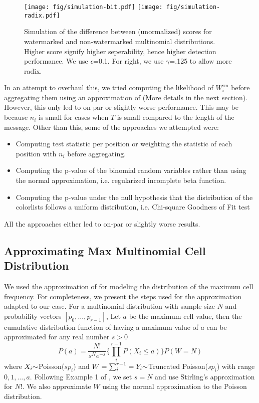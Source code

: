 \begin{figure}[th!]
    \centering
    \texttt{[image: fig/simulation-bit.pdf]}
    \texttt{[image: fig/simulation-radix.pdf]}
    \caption{Simulation of the difference between (unormalized) scores for watermarked and non-watermarked multinomial distributions. Higher score signify higher seperability, hence higher detection performance. We use $\epsilon$=0.1. For right, we use $\gamma$=.125 to allow more radix.}\label{fig:simulation}
\end{figure}

In an attempt to overhaul this, we tried computing the likelihood of $W_i^\text{rm}$ before aggregating them using an approximation of \cite{levin1981representation} (More details in the next section). However, this only led to on par or slightly worse performance. This may be because $n_i$ is small for cases when $T$ is small compared to the length of the message. 
Other than this, some of the approaches we attempted were:
\begin{itemize}
    \item Computing test statistic per position or weighting the statistic of each position with $n_i$ before aggregating.
    \item Computing the p-value of the binomial random variables rather than using the normal approximation, i.e. regularized incomplete beta function.
    \item Computing the p-value under the null hypothesis that the distribution of the colorlists follows a uniform distribution, i.e. Chi-square Goodness of Fit test    
\end{itemize}
All the approaches either led to on-par or slightly worse results. 


\subsection{Approximating Max Multinomial Cell Distribution}\label{appendix:max-multi-approx}
We used the approximation of \cite{levin1981representation} for modeling the distribution of the maximum cell frequency. For completeness, we present the steps used for the approximation adapted to our case. For a multinomial distribution with sample size $N$ and probability vectors $[p_0, \dots, p_{r-1}]$, Let $a$ be the maximum cell value, then the cumulative distribution function of having a maximum value of $a$ can be approximated for any real number $s > 0$
\begin{equation}
    P(a) = \frac{N!}{s^{N}e^{-s}}\{\prod_i^{r-1} P(X_i \leq a)\} P(W=N)
\end{equation}
where $X_i\distas{}$Poisson($sp_i$) and $W=\sum_i^{r-1}=Y_i\distas{}$Truncated Poisson($sp_i$) with range $0,1,\dots,a$. Following Example 1 of \cite{levin1981representation}, we set $s=N$ and use Stirling's approximation for $N!$. We also approximate $W$ using the normal approximation to the Poisson distribution.



